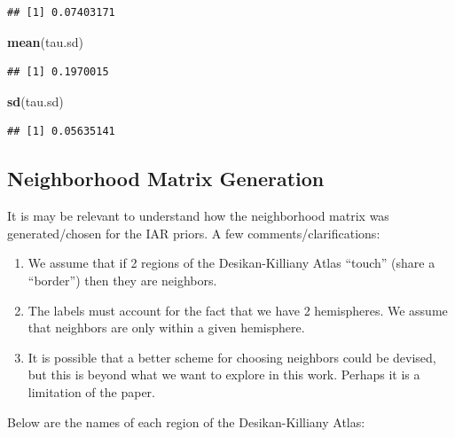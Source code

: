 \documentclass[
]{article}
\newenvironment{Shaded}{\begin{snugshade}}{\end{snugshade}}
\newcommand{\KeywordTok}[1]{\textcolor[rgb]{0.13,0.29,0.53}{\textbf{#1}}}
\newcommand{\NormalTok}[1]{#1}
\begin{document}
\begin{verbatim}
## [1] 0.07403171
\end{verbatim}

\begin{Shaded}
\begin{Highlighting}[]
\KeywordTok{mean}\NormalTok{(tau.sd)}
\end{Highlighting}
\end{Shaded}

\begin{verbatim}
## [1] 0.1970015
\end{verbatim}

\begin{Shaded}
\begin{Highlighting}[]
\KeywordTok{sd}\NormalTok{(tau.sd)}
\end{Highlighting}
\end{Shaded}

\begin{verbatim}
## [1] 0.05635141
\end{verbatim}

\hypertarget{neighborhood-matrix-generation}{%
\subsection{Neighborhood Matrix
Generation}\label{neighborhood-matrix-generation}}

It is may be relevant to understand how the neighborhood matrix was
generated/chosen for the IAR priors. A few comments/clarifications:

\begin{enumerate}
\def\labelenumi{(\arabic{enumi})}
\item
  We assume that if 2 regions of the Desikan-Killiany Atlas ``touch''
  (share a ``border'') then they are neighbors.
\item
  The labels must account for the fact that we have 2 hemispheres. We
  assume that neighbors are only within a given hemisphere.
\item
  It is possible that a better scheme for choosing neighbors could be
  devised, but this is beyond what we want to explore in this work.
  Perhaps it is a limitation of the paper.
\end{enumerate}

Below are the names of each region of the Desikan-Killiany Atlas:
\end{document}
